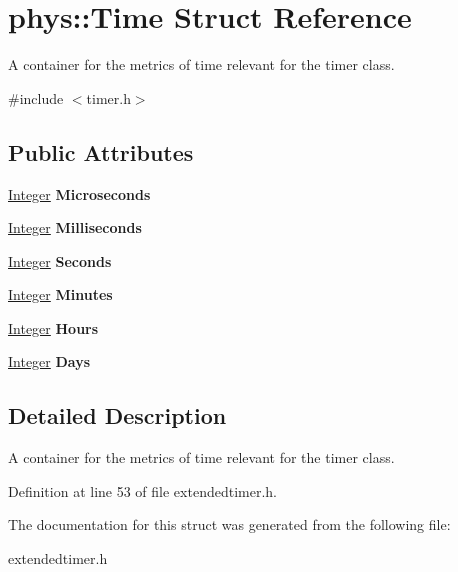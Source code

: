 \hypertarget{structphys_1_1Time}{
\section{phys::Time Struct Reference}
\label{de/db1/structphys_1_1Time}
}


A container for the metrics of time relevant for the timer class.  




{\ttfamily \#include $<$timer.h$>$}

\subsection*{Public Attributes}
\begin{DoxyCompactItemize}
\item 
\hypertarget{structphys_1_1Time_ad0e070fdec0d826d73dc01f5ee4dddc7}{
\hyperlink{namespacephys_a7f09bf5585b2bb97613cd9aad4273a81}{Integer} {\bfseries Microseconds}}
\label{de/db1/structphys_1_1Time_ad0e070fdec0d826d73dc01f5ee4dddc7}

\item 
\hypertarget{structphys_1_1Time_afeb0b8025b7cea824a84523565d7dd60}{
\hyperlink{namespacephys_a7f09bf5585b2bb97613cd9aad4273a81}{Integer} {\bfseries Milliseconds}}
\label{de/db1/structphys_1_1Time_afeb0b8025b7cea824a84523565d7dd60}

\item 
\hypertarget{structphys_1_1Time_aa526d7de0d2fde457dc458d7ee6285d1}{
\hyperlink{namespacephys_a7f09bf5585b2bb97613cd9aad4273a81}{Integer} {\bfseries Seconds}}
\label{de/db1/structphys_1_1Time_aa526d7de0d2fde457dc458d7ee6285d1}

\item 
\hypertarget{structphys_1_1Time_a142f48583baee67495ea65acf76cbdd5}{
\hyperlink{namespacephys_a7f09bf5585b2bb97613cd9aad4273a81}{Integer} {\bfseries Minutes}}
\label{de/db1/structphys_1_1Time_a142f48583baee67495ea65acf76cbdd5}

\item 
\hypertarget{structphys_1_1Time_aceeebc7a8950d38fb9c9bcf483a5a751}{
\hyperlink{namespacephys_a7f09bf5585b2bb97613cd9aad4273a81}{Integer} {\bfseries Hours}}
\label{de/db1/structphys_1_1Time_aceeebc7a8950d38fb9c9bcf483a5a751}

\item 
\hypertarget{structphys_1_1Time_aab43bd475fab9342887b0762281e80a4}{
\hyperlink{namespacephys_a7f09bf5585b2bb97613cd9aad4273a81}{Integer} {\bfseries Days}}
\label{de/db1/structphys_1_1Time_aab43bd475fab9342887b0762281e80a4}

\end{DoxyCompactItemize}


\subsection{Detailed Description}
A container for the metrics of time relevant for the timer class. 

Definition at line 53 of file extendedtimer.h.



The documentation for this struct was generated from the following file:\begin{DoxyCompactItemize}
\item 
extendedtimer.h\end{DoxyCompactItemize}
